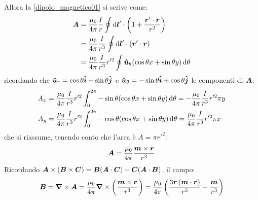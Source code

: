 Allora la \eqref{dipolo_magnetico01} si scrive come:
\begin{equation}
  \begin{aligned}
    \boldsymbol{A} & = \frac{\mu_0}{4\pi}\frac{I}{r}\oint \mathrm{d}\boldsymbol{l}'\cdot\left(1+\frac{\boldsymbol{r}'\cdot \boldsymbol{r}}{r^2}\right) \\
          & = \frac{\mu_0}{4\pi}\frac{I}{r^3}\oint \mathrm{d}\boldsymbol{l}'\cdot(\boldsymbol{r}'\cdot \boldsymbol{r})                        \\
          & = \frac{\mu_0}{4\pi}\frac{I}{r^3}r'^2\oint \boldsymbol{\hat {u}}_\theta(\cos\theta x+\sin\theta y)\,\mathrm{d}\theta
  \end{aligned}
\end{equation}
ricordando che $\boldsymbol{\hat {u}}_r = \cos\theta\boldsymbol{\hat {i}}+\sin\theta\boldsymbol{\hat {j}}$ e $\boldsymbol{\hat {u}}_\theta = -\sin\theta\boldsymbol{\hat {i}}+\cos\theta\boldsymbol{\hat {j}}$ le componenti di $\boldsymbol{A}$:
\begin{equation*}
  \begin{aligned}
    A_x & = \frac{\mu_0}{4\pi}\frac{I}{r^3}r'^2\int_0^{2\pi}-\sin\theta(\cos\theta x+\sin\theta y)\,\mathrm{d}\theta=-\frac{\mu_0}{4\pi}\frac{I}{r^3}r'^2\pi y \\
    A_y & = \frac{\mu_0}{4\pi}\frac{I}{r^3}r'^2\int_0^{2\pi}-\cos\theta(\cos\theta x+\sin\theta y)\,\mathrm{d}\theta=\frac{\mu_0}{4\pi}\frac{I}{r^3}r'^2\pi x  \\
  \end{aligned}
\end{equation*}
che si riassume, tenendo conto che l'area è $A=\pi r'^2$:
\begin{equation}
  \boldsymbol{A}=\frac{\mu_0}{4\pi}\frac{\boldsymbol{m}\times\boldsymbol{r}}{r^3}
  \label{eq:potenziale_vettoriale_dipolo_magnetico}
\end{equation}
Ricordando $\boldsymbol{A}\times(\boldsymbol{B}\times \boldsymbol{C})=\boldsymbol{B}(\boldsymbol{A}\cdot \boldsymbol{C})-\boldsymbol{C}(\boldsymbol{A}\cdot \boldsymbol{B})$, il campo:
\begin{equation}
\boldsymbol{B} = \boldsymbol{\nabla}\times\boldsymbol{A} = \frac{\mu_0}{4\pi}\boldsymbol{\nabla}\times\left(\frac{\boldsymbol{m}\times\boldsymbol{r}}{r^3}\right) = \frac{\mu_0}{4\pi} \left(\frac{ 3\boldsymbol{r}\left(\boldsymbol{m}\cdot \boldsymbol{r}\right)}{r^5}-\frac{\boldsymbol{m}}{r^3}\right)
\label{eq:campo_magnatico_dipolo_magnetico}
\end{equation}

